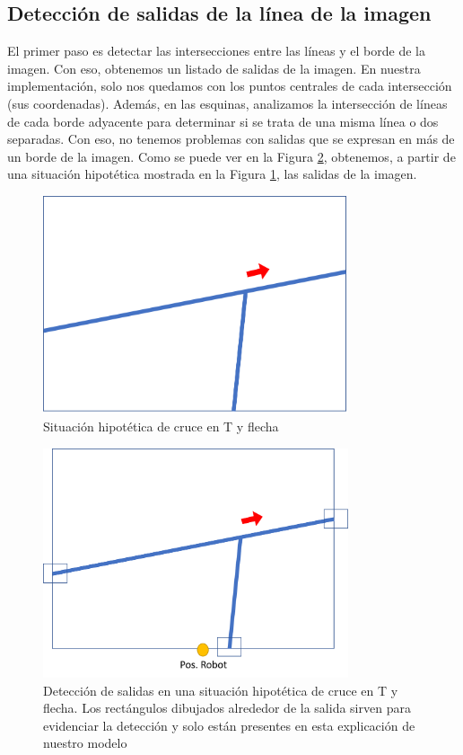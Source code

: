 \documentclass{article}
\begin{document}
    \subsection{Detección de salidas de la línea de la imagen}
        El primer paso es detectar las intersecciones entre las líneas y el borde de la imagen. Con eso, obtenemos un listado de salidas de la imagen. En nuestra implementación, solo nos quedamos con los puntos centrales de cada intersección (sus coordenadas). Además, en las esquinas, analizamos la intersección de líneas de cada borde adyacente para determinar si se trata de una misma línea o dos separadas. Con eso, no tenemos problemas con salidas que se expresan en más de un borde de la imagen. Como se puede ver en la Figura \ref{fig:consigna2}, obtenemos, a partir de una situación hipotética mostrada en la Figura \ref{fig:consigna1}, las salidas de la imagen.

        \begin{figure}[]
            \centering
            \includegraphics[width=9cm]{figures/consigna1.png}
            \caption{Situación hipotética de cruce en T y flecha}
            \label{fig:consigna1}
        \end{figure}

        \begin{figure}[]
            \centering
            \includegraphics[width=9cm]{figures/consigna2.png}
            \caption{Detección de salidas en una situación hipotética de cruce en T y flecha. Los rectángulos dibujados alrededor de la salida sirven para evidenciar la detección y solo están presentes en esta explicación de nuestro modelo}
            \label{fig:consigna2}
        \end{figure}
\end{document}

